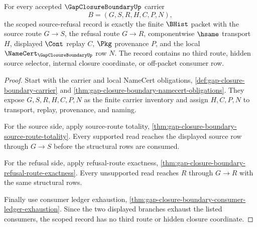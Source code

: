 \begin{theorem}
\label{thm:gap-closure-boundary-scoped-source-refusal-record}
For every accepted $\GapClosureBoundaryUp$ carrier
$$
B=(G,S,R,H,C,P,N),
$$
the scoped source-refusal record is exactly the finite $\BHist$ packet with the source route $G \longrightarrow S$, the refusal route $G \longrightarrow R$, componentwise $\hsame$ transport $H$, displayed $\Cont$ replay $C$, $\Pkg$ provenance $P$, and the local $\NameCert_{\GapClosureBoundaryUp}$ row $N$. The record contains no third route, hidden source selector, internal closure coordinate, or off-packet consumer row.
\end{theorem}
\begin{proof}
Start with the carrier and local NameCert obligations, \autoref{def:gap-closure-boundary-carrier} and \autoref{thm:gap-closure-boundary-namecert-obligations}. They expose $G,S,R,H,C,P,N$ as the finite carrier inventory and assign $H,C,P,N$ to transport, replay, provenance, and naming.

For the source side, apply source-route totality, \autoref{thm:gap-closure-boundary-source-route-totality}. Every supported read reaches the displayed source row through $G \longrightarrow S$ before the structural rows are consumed.

For the refusal side, apply refusal-route exactness, \autoref{thm:gap-closure-boundary-refusal-route-exactness}. Every unsupported read reaches $R$ through $G \longrightarrow R$ with the same structural rows.

Finally use consumer ledger exhaustion, \autoref{thm:gap-closure-boundary-consumer-ledger-exhaustion}. Since the two displayed branches exhaust the listed consumers, the scoped record has no third route or hidden closure coordinate.
\end{proof}

